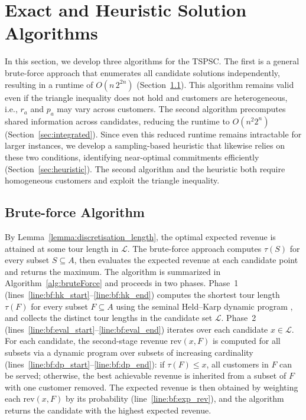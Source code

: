 \documentclass[11pt]{article}
\theoremstyle{plain}
\theoremstyle{definition}
\begin{document}
    \section{Exact and Heuristic Solution Algorithms}
    \label{sec:algorithms}
    In this section, we develop three algorithms for the \ac{TSPSC}. The first is a general brute-force approach that enumerates all candidate solutions independently, resulting in a runtime of $O(n\,2^{2n})$ (Section~\ref{sec:bruteForce}). This algorithm remains valid even if the triangle inequality does not hold and customers are heterogeneous, i.e., $r_a$ and $p_a$ may vary across customers. The second algorithm precomputes shared information across candidates, reducing the runtime to $O(n^2 2^n)$ (Section~\ref{sec:integrated}). Since even this reduced runtime remains intractable for larger instances, we develop a sampling-based heuristic that likewise relies on these two conditions, identifying near-optimal commitments efficiently (Section~\ref{sec:heuristic}). The second algorithm and the heuristic both require homogeneous customers and exploit the triangle inequality.
	
	\subsection{Brute-force Algorithm}\label{sec:bruteForce}
	
	By Lemma~\ref{lemma:discretisation_length}, the optimal expected revenue is attained at some tour length in $\mathcal{L}$. The brute-force approach computes $\tau(S)$ for every subset $S \subseteq A$, then evaluates the expected revenue at each candidate point and returns the maximum. 
	The algorithm is summarized in Algorithm~\ref{alg:bruteForce} and proceeds in two phases. Phase~1 (lines~\ref{line:bf:hk_start}--\ref{line:bf:hk_end}) computes the shortest tour length $\tau(F)$ for every subset $F \subseteq A$ using the seminal Held--Karp dynamic program \citep{held1962dynamic}, and collects the distinct tour lengths in the candidate set $\mathcal{L}$. Phase~2 (lines~\ref{line:bf:eval_start}--\ref{line:bf:eval_end}) iterates over each candidate $x \in \mathcal{L}$. For each candidate, the second-stage revenue $\text{rev}(x, F)$ is computed for all subsets via a dynamic program over subsets of increasing cardinality (lines~\ref{line:bf:dp_start}--\ref{line:bf:dp_end}): if $\tau(F) \leq x$, all customers in $F$ can be served; otherwise, the best achievable revenue is inherited from a subset of $F$ with one customer removed. The expected revenue is then obtained by weighting each $\text{rev}(x, F)$ by its probability (line~\ref{line:bf:exp_rev}), and the algorithm returns the candidate with the highest expected revenue.
	
\end{document}
